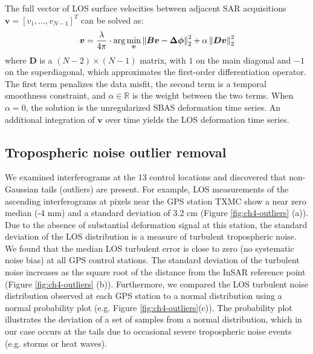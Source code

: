 The full vector of LOS surface velocities between adjacent SAR acquisitions $ \bm{v} = \left[v_1 , \ldots , v_{N-1} \right]^T $ can be solved as:
\begin{equation}
		\bm{v} = \frac{\lambda }{4 \pi} \cdot \arg \min_{\bm{v} } \left\lVert \bm{Bv} - \bm{\Delta \phi}   \right\rVert^2_2 + \alpha \left\lVert \bm{Dv} \right\rVert^2_2  \label{eq:ch4-sbas}
\end{equation}
where $ \bm{D} $ is a $ (N-2) \times (N-1) $ matrix, with $1$ on the main diagonal and $-1$ on the superdiagonal, which approximates the first-order differentiation operator. The first term penalizes the data misfit, the second term is a temporal smoothness constraint, and $ \alpha \in \mathbb{R} $ is the weight between the two terms. When $ \alpha = 0 $, the solution is the unregularized SBAS deformation time series. An additional integration of $\mathbf{v}$ over time yields the LOS deformation time series.



\subsection{Tropospheric noise outlier removal}
\label{sec:ch4-outlier-method}

We examined interferograms at the 13 control locations and discovered that non-Gaussian tails (outliers) are present. For example, LOS measurements of the ascending interferograms at pixels near the GPS station TXMC show a near zero median (-4 mm) and a standard deviation of 3.2 cm (Figure \ref{fig:ch4-outliers} (a)). Due to the absence of substantial deformation signal at this station, the standard deviation of the LOS distribution is a measure of turbulent tropospheric noise.  We found that the median LOS turbulent error is close to zero (no systematic noise bias) at all GPS control stations. The standard deviation of the turbulent noise increases as the square root of the distance from the InSAR reference point (Figure \ref{fig:ch4-outliers} (b)). Furthermore, we compared the LOS turbulent noise distribution observed at each GPS station to a normal distribution using a normal probability plot \citep{Filliben1975ProbabilityPlotCorrelation} (e.g. Figure \ref{fig:ch4-outliers}(c)). The probability plot illustrates the deviation of a set of samples from a normal distribution, which in our case occurs at the tails due to occasional severe tropospheric noise events (e.g. storms or heat waves). 



